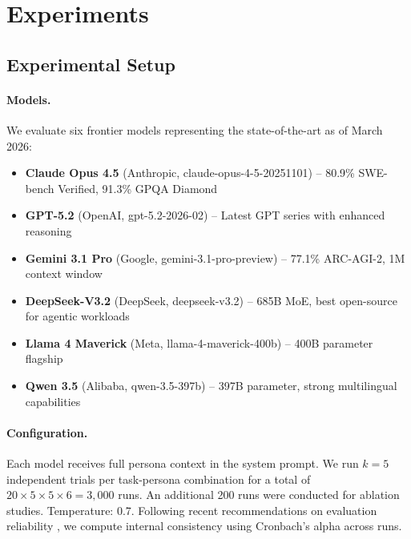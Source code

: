 \documentclass{article}
\begin{document}
\section{Experiments}
\label{sec:experiments}

\subsection{Experimental Setup}

\paragraph{Models.} We evaluate six frontier models representing the state-of-the-art as of March 2026:
\begin{itemize}[leftmargin=*, itemsep=1pt]
    \item \textbf{Claude Opus 4.5} (Anthropic, claude-opus-4-5-20251101) -- 80.9\% SWE-bench Verified, 91.3\% GPQA Diamond
    \item \textbf{GPT-5.2} (OpenAI, gpt-5.2-2026-02) -- Latest GPT series with enhanced reasoning
    \item \textbf{Gemini 3.1 Pro} (Google, gemini-3.1-pro-preview) -- 77.1\% ARC-AGI-2, 1M context window
    \item \textbf{DeepSeek-V3.2} (DeepSeek, deepseek-v3.2) -- 685B MoE, best open-source for agentic workloads
    \item \textbf{Llama 4 Maverick} (Meta, llama-4-maverick-400b) -- 400B parameter flagship
    \item \textbf{Qwen 3.5} (Alibaba, qwen-3.5-397b) -- 397B parameter, strong multilingual capabilities
\end{itemize}

\paragraph{Configuration.} Each model receives full persona context in the system prompt. We run $k=5$ independent trials per task-persona combination for a total of $20 \times 5 \times 5 \times 6 = 3,000$ runs. An additional 200 runs were conducted for ablation studies. Temperature: 0.7. Following recent recommendations on evaluation reliability \citep{agentreliability2026}, we compute internal consistency using Cronbach's alpha across runs.
\end{document}
